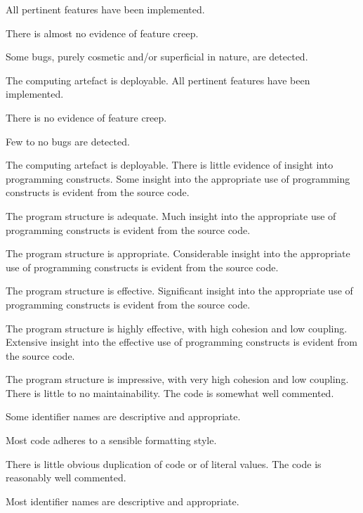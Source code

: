 \begin{markingrubric}
        \grade All pertinent features have been implemented.
            \par There is almost no evidence of feature creep.
            \par Some bugs, purely cosmetic and/or superficial in nature, are detected.
            \par The computing artefact is deployable.
        \grade All pertinent features have been implemented.
            \par There is no evidence of feature creep.
            \par Few to no bugs are detected.
            \par The computing artefact is deployable.
%
        \grade \fail There is little evidence of insight into programming constructs.
        \grade Some insight into the appropriate use of programming constructs is evident from the source code.
            \par The program structure is adequate.
        \grade Much insight into the appropriate use of programming constructs is evident from the source code.
            \par The program structure is appropriate.
        \grade Considerable insight into the appropriate use of programming constructs is evident from the source code.
            \par The program structure is effective.
        \grade Significant insight into the appropriate use of programming constructs is evident from the source code.
            \par The program structure is highly effective, with high cohesion and low coupling.
        \grade Extensive insight into the effective use of programming constructs is evident from the source code.
            \par The program structure is impressive, with very high cohesion and low coupling.
%
        \grade \fail There is little to no maintainability. 
        \grade The code is somewhat well commented.
            \par Some identifier names are descriptive and appropriate.
            \par Most code adheres to a sensible formatting style.
             \par There is little obvious duplication of code or of literal values.           
        \grade The code is reasonably well commented.
            \par Most identifier names are descriptive and appropriate.

\end{markingrubric}
